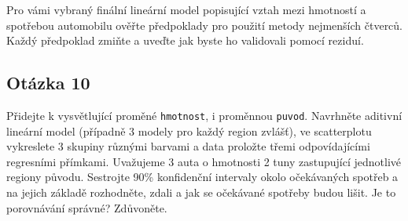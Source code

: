 \documentclass[
]{article}
\begin{document}
Pro vámi vybraný finální lineární model popisující vztah mezi hmotností
a spotřebou automobilu ověřte předpoklady pro použití metody nejmenších
čtverců. Každý předpoklad zmiňte a uveďte jak byste ho validovali pomocí
reziduí.

\hypertarget{otuxe1zka-10}{%
\subsection{Otázka 10}\label{otuxe1zka-10}}

Přidejte k vysvětlující proměné \texttt{hmotnost}, i proměnnou
\texttt{puvod}. Navrhněte aditivní lineární model (případně 3 modely pro
každý region zvlášť), ve scatterplotu vykreslete 3 skupiny různými
barvami a data proložte třemi odpovídajícími regresními přímkami.
Uvažujeme 3 auta o hmotnosti 2 tuny zastupující jednotlivé regiony
původu. Sestrojte 90\% konfidenční intervaly okolo očekávaných spotřeb a
na jejich základě rozhodněte, zdali a jak se očekávané spotřeby budou
lišit. Je to porovnávání správné? Zdůvoněte.
\end{document}
